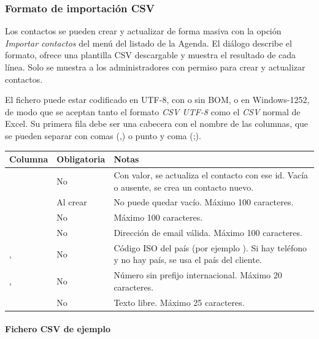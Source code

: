 \documentclass[letterpaper,10pt,spanish]{sphinxmanual}
\begin{document}
\subsubsection{Formato de importación CSV}
\label{administration_portal/client/vpbx/addressbook:csv-import-format}
Los contactos se pueden crear y actualizar de forma masiva con la opción \emph{Importar contactos} del menú del listado de la Agenda. El diálogo describe el formato, ofrece una plantilla CSV descargable y muestra el resultado de cada línea. Solo se muestra a los administradores con permiso para crear y actualizar contactos.

El fichero puede estar codificado en UTF-8, con o sin BOM, o en Windows-1252, de modo que se aceptan tanto el formato \emph{CSV UTF-8} como el \emph{CSV} normal de Excel. Su primera fila debe ser una cabecera con el nombre de las columnas, que se pueden separar con comas (,) o punto y coma (;).

\noindent\begin{tabulary}{\linewidth}{|L|L|L|}
\hline
\textsf{\relax 
Columna
\unskip}\relax &\textsf{\relax 
Obligatoria
\unskip}\relax &\textsf{\relax 
Notas
\unskip}\relax \\
\hline
{}
&
No
&
Con valor, se actualiza el contacto con ese id. Vacía o ausente, se crea un contacto nuevo.
\\
\hline
{}
&
Al crear
&
No puede quedar vacío. Máximo 100 caracteres.
\\
\hline
{}
&
No
&
Máximo 100 caracteres.
\\
\hline
{}
&
No
&
Dirección de email válida. Máximo 100 caracteres.
\\
\hline
{}, 
&
No
&
Código ISO del país (por ejemplo ). Si hay teléfono y no hay país, se usa el país del cliente.
\\
\hline
{}, 
&
No
&
Número sin prefijo internacional. Máximo 20 caracteres.
\\
\hline
{}
&
No
&
Texto libre. Máximo 25 caracteres.
\\
\hline\end{tabulary}

\paragraph{Fichero CSV de ejemplo}
\end{document}
